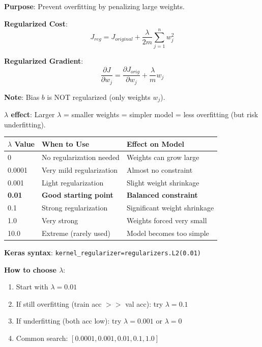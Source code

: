 \documentclass[11pt,a4paper]{article}
\begin{document}
\begin{definitionbox}[L2 Regularization]

\textbf{Purpose}: Prevent overfitting by penalizing large weights.

\textbf{Regularized Cost}:
\[J_{reg} = J_{original} + \frac{\lambda}{2m}\sum_{j=1}^{n} w_j^2\]

\textbf{Regularized Gradient}:
\[\frac{\partial J}{\partial w_j} = \frac{\partial J_{orig}}{\partial w_j} + \frac{\lambda}{m}w_j\]

\textbf{Note}: Bias $b$ is NOT regularized (only weights $w_j$).

\textbf{$\lambda$ effect}: Larger $\lambda$ = smaller weights = simpler model = less overfitting (but risk underfitting).
\end{definitionbox}

\begin{examplebox}
\begin{tabular}{@{}l|l|l@{}}
\textbf{$\lambda$ Value} & \textbf{When to Use} & \textbf{Effect on Model} \\
\hline
0 & No regularization needed & Weights can grow large \\
0.0001 & Very mild regularization & Almost no constraint \\
0.001 & Light regularization & Slight weight shrinkage \\
\textbf{0.01} & \textbf{Good starting point} & \textbf{Balanced constraint} \\
0.1 & Strong regularization & Significant weight shrinkage \\
1.0 & Very strong & Weights forced very small \\
10.0 & Extreme (rarely used) & Model becomes too simple \\
\end{tabular}

\vspace{0.5em}
\textbf{Keras syntax}: \texttt{kernel\_regularizer=regularizers.L2(0.01)}

\textbf{How to choose $\lambda$}:
\begin{enumerate}[leftmargin=*,nosep]
\item Start with $\lambda = 0.01$
\item If still overfitting (train acc $>>$ val acc): try $\lambda = 0.1$
\item If underfitting (both acc low): try $\lambda = 0.001$ or $\lambda = 0$
\item Common search: $[0.0001, 0.001, 0.01, 0.1, 1.0]$
\end{enumerate}
\end{examplebox}
\end{document}
